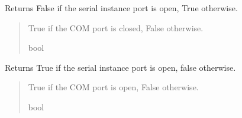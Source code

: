 \documentclass[letterpaper,10pt,english]{sphinxmanual}
\begin{document}
\begin{fulllineitems}
\begin{fulllineitems}
\label{\detokenize{PodApi.Devices.SerialPorts:PodApi.Devices.SerialPorts.SerialComm.PortIO.IsSerialClosed}}
\pysigstartsignatures
{}
\pysigstopsignatures
\sphinxAtStartPar
Returns False if the serial instance port is open, True otherwise.
\begin{quote}\begin{description}
\sphinxAtStartPar
True if the COM port is closed, False otherwise.

\sphinxAtStartPar
bool

\end{description}\end{quote}

\end{fulllineitems}


\begin{fulllineitems}
\label{\detokenize{PodApi.Devices.SerialPorts:PodApi.Devices.SerialPorts.SerialComm.PortIO.IsSerialOpen}}
\pysigstartsignatures
{}
\pysigstopsignatures
\sphinxAtStartPar
Returns True if the serial instance port is open, false otherwise.
\begin{quote}\begin{description}
\sphinxAtStartPar
True if the COM port is open, False otherwise.

\sphinxAtStartPar
bool

\end{description}\end{quote}

\end{fulllineitems}



\end{fulllineitems}
\end{document}

